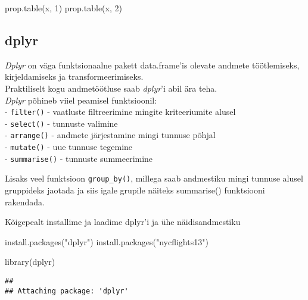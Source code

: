 \documentclass[
]{book}
\newenvironment{Shaded}{\begin{snugshade}}{\end{snugshade}}
\newcommand{\DecValTok}[1]{\textcolor[rgb]{0.00,0.00,0.81}{#1}}
\newcommand{\FunctionTok}[1]{\textcolor[rgb]{0.00,0.00,0.00}{#1}}
\newcommand{\NormalTok}[1]{#1}
\newcommand{\StringTok}[1]{\textcolor[rgb]{0.31,0.60,0.02}{#1}}
\begin{document}
\begin{Shaded}
\begin{Highlighting}[]
\FunctionTok{prop.table}\NormalTok{(x, }\DecValTok{1}\NormalTok{)}
\FunctionTok{prop.table}\NormalTok{(x, }\DecValTok{2}\NormalTok{)}
\end{Highlighting}
\end{Shaded}

\hypertarget{dplyr}{%
\subsection{dplyr}\label{dplyr}}

\emph{Dplyr} on väga funktsionaalne pakett data.frame'is olevate andmete töötlemiseks, kirjeldamiseks ja transformeerimiseks.\\
Praktiliselt kogu andmetöötluse saab \emph{dplyr}'i abil ära teha.\\
\emph{Dplyr} põhineb viiel peamisel funktsioonil:\\
- \texttt{filter()} - vaatluste filtreerimine mingite kriteeriumite alusel\\
- \texttt{select()} - tunnuste valimine\\
- \texttt{arrange()} - andmete järjestamine mingi tunnuse põhjal\\
- \texttt{mutate()} - uue tunnuse tegemine\\
- \texttt{summarise()} - tunnuste summeerimine

Lisaks veel funktsioon \texttt{group\_by()}, millega saab andmestiku mingi tunnuse alusel gruppideks jaotada ja siis igale grupile näiteks summarise() funktsiooni rakendada.

Kõigepealt installime ja laadime dplyr'i ja ühe näidisandmestiku

\begin{Shaded}
\begin{Highlighting}[]
\FunctionTok{install.packages}\NormalTok{(}\StringTok{"dplyr"}\NormalTok{)}
\FunctionTok{install.packages}\NormalTok{(}\StringTok{"nycflights13"}\NormalTok{)}
\end{Highlighting}
\end{Shaded}

\begin{Shaded}
\begin{Highlighting}[]
\FunctionTok{library}\NormalTok{(dplyr)}
\end{Highlighting}
\end{Shaded}

\begin{verbatim}
## 
## Attaching package: 'dplyr'
\end{verbatim}
\end{document}
